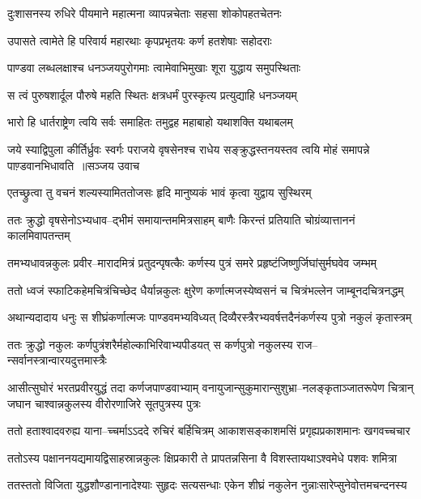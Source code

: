 \twolineshloka
{दुःशासनस्य रुधिरे पीयमाने महात्मना}
{व्यापन्नचेताः सहसा शोकोपहतचेतनः}


\twolineshloka
{उपासते त्वामेते हि परिवार्य महारथाः}
{कृपप्रभृतयः कर्ण हतशेषाः सहोदराः}


\twolineshloka
{पाण्डवा लब्धलक्षाश्च धनञ्जयपुरोगमाः}
{त्वामेवाभिमुखाः शूरा युद्धाय समुपस्थिताः}


\twolineshloka
{स त्वं पुरुषशार्दूल पौरुषे महति स्थितः}
{क्षत्रधर्मं पुरस्कृत्य प्रत्युद्याहि धनञ्जयम्}


\twolineshloka
{भारो हि धार्तराष्ट्रेण त्वयि सर्वः समाहितः}
{तमुद्वह महाबाहो यथाशक्ति यथाबलम्}


\fourlineindentedshloka
{जये स्याद्विपुला कीर्तिर्ध्रुवः स्वर्गः पराजये}
{वृषसेनश्च राधेय सङ्क्रुद्धस्तनयस्तव}
{त्वयि मोहं समापन्ने पाण़्डवानभिधावति ॥सञ्जय उवाच}
{}


\twolineshloka
{एतच्छ्रुत्वा तु वचनं शल्यस्यामिततोजसः}
{हृदि मानुष्यकं भावं कृत्वा युद्वाय सुस्थिरम्}


\twolineshloka
{ततः क्रुद्धो वृषसेनोऽभ्यधाव--द्भीमं समायान्तममित्रसाहम्}
{बाणैः किरन्तं प्रतियाति चोग्रंव्यात्ताननं कालमिवापतन्तम्}


\twolineshloka
{तमभ्यधावन्नकुलः प्रवीर--मारादमित्रं प्रतुदन्पृषत्कैः}
{कर्णस्य पुत्रं समरे प्रहृष्टंजिष्णुर्जिघांसुर्मघवेव जम्भम्}


\twolineshloka
{ततो ध्वजं स्फाटिकहेमचित्रंचिच्छेद धैर्यान्नकुलः क्षुरेण}
{कर्णात्मजस्येष्वसनं च चित्रंभल्लेन जाम्बूनदचित्रनद्धम्}


\twolineshloka
{अथान्यदादाय धनुः स शीघ्रंकर्णात्मजः पाण्डवमभ्यविध्यत्}
{दिव्यैरस्त्रैरभ्यवर्षत्तदैनंकर्णस्य पुत्रो नकुलं कृतास्त्रम्}


\twolineshloka
{ततः क्रुद्धो नकुलः कर्णपुत्रंशरैर्महोल्काभिरिवाभ्यपीडयत्}
{स कर्णपुत्रो नकुलस्य राज--न्सर्वानस्त्रान्वारयदुत्तमास्त्रैः}


आसीत्सुघोरं भरतप्रवीरयुद्धं तदा कर्णजपाण्डवाभ्याम्
\twolineshloka
{वनायुजान्सुकुमारान्सुशुभ्रा--नलङ्कृताञ्जातरूपेण चित्रान्}
{जघान चाश्वान्नकुलस्य वीरोरणाजिरे सूतपुत्रस्य पुत्रः}


\twolineshloka
{ततो हताश्वादवरुह्य याना--च्चर्माऽऽददे रुचिरं बर्हिचित्रम्}
{आकाशसङ्काशमसिं प्रगृह्यप्रकाशमानः खगवच्चचार}


\twolineshloka
{ततोऽस्य पक्षाननयद्यमायद्विसाहस्रान्नकुलः क्षिप्रकारी}
{ते प्रापतन्नसिना वै विशस्तायथाऽश्वमेधे पशवः शमित्रा}


\twolineshloka
{ततस्ततो विजिता युद्धशौण्डानानादेश्याः सुहृदः सत्यसन्धाः}
{एकेन शीघ्रं नकुलेन नुन्नाःसारेप्सुनेवोत्तमचन्दनस्य}


